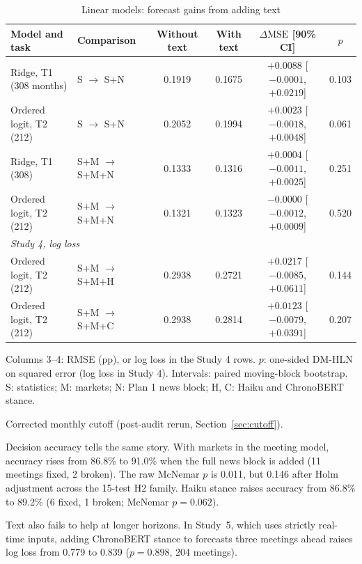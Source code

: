 \documentclass[11pt]{article}
\newcommand{\dmse}{\Delta\mathrm{MSE}}
\begin{document}
\begin{table}[ht]\centering\footnotesize\setlength{\tabcolsep}{3.5pt}
\begin{threeparttable}
\caption{Linear models: forecast gains from adding text}\label{tab:linear}
\begin{tabular}{llcccc}
\toprule
Model and task & Comparison & Without text & With text & $\dmse$ [90\% CI] & $p$ \\ \midrule
Ridge, T1 (308 months)\tnote{a} & S $\to$ S+N & 0.1919 & 0.1675 & $+0.0088$ [$-0.0001$, $+0.0219$] & 0.103 \\
Ordered logit, T2 (212) & S $\to$ S+N & 0.2052 & 0.1994 & $+0.0023$ [$-0.0018$, $+0.0048$] & 0.061 \\
Ridge, T1 (308)\tnote{a} & S+M $\to$ S+M+N & 0.1333 & 0.1316 & $+0.0004$ [$-0.0011$, $+0.0025$] & 0.251 \\
Ordered logit, T2 (212) & S+M $\to$ S+M+N & 0.1321 & 0.1323 & $-0.0000$ [$-0.0012$, $+0.0009$] & 0.520 \\ \midrule
\multicolumn{6}{l}{\emph{Study 4, log loss}} \\
Ordered logit, T2 (212) & S+M $\to$ S+M+H & 0.2938 & 0.2721 & $+0.0217$ [$-0.0085$, $+0.0611$] & 0.144 \\
Ordered logit, T2 (212) & S+M $\to$ S+M+C & 0.2938 & 0.2814 & $+0.0123$ [$-0.0079$, $+0.0391$] & 0.207 \\
\bottomrule
\end{tabular}
\begin{tablenotes}\footnotesize
\item Columns 3--4: RMSE (pp), or log loss in the Study 4 rows. $p$: one-sided DM-HLN on squared error (log loss
in Study 4). Intervals: paired moving-block bootstrap. S: statistics; M: markets; N: Plan 1 news block; H, C:
Haiku and ChronoBERT stance.
\item[a] Corrected monthly cutoff (post-audit rerun, Section~\ref{sec:cutoff}).
\end{tablenotes}
\end{threeparttable}
\end{table}

Decision accuracy tells the same story. With markets in the meeting model, accuracy rises from 86.8\% to 91.0\%
when the full news block is added (11 meetings fixed, 2 broken). The raw McNemar $p$ is 0.011, but 0.146 after
Holm adjustment across the 15-test H2 family. Haiku stance raises accuracy from 86.8\% to 89.2\% (6 fixed, 1
broken; McNemar $p=0.062$).

Text also fails to help at longer horizons. In Study~5, which uses strictly real-time inputs, adding ChronoBERT
stance to forecasts three meetings ahead raises log loss from 0.779 to 0.839 ($p=0.898$, 204 meetings).
\end{document}
